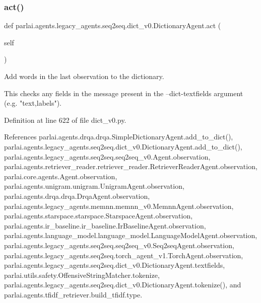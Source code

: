\mbox{\label{classparlai_1_1agents_1_1legacy__agents_1_1seq2seq_1_1dict__v0_1_1DictionaryAgent_ab0369e37e5da8b1d44a95c4765701cdc}} 
\subsubsection{\texorpdfstring{act()}{act()}}
{\footnotesize\ttfamily def parlai.\+agents.\+legacy\+\_\+agents.\+seq2seq.\+dict\+\_\+v0.\+Dictionary\+Agent.\+act (\begin{DoxyParamCaption}\item[{}]{self }\end{DoxyParamCaption})}

\begin{DoxyVerb}Add words in the last observation to the dictionary.

This checks any fields in the message present in the --dict-textfields
argument (e.g. "text,labels").
\end{DoxyVerb}
 

Definition at line 622 of file dict\+\_\+v0.\+py.



References parlai.\+agents.\+drqa.\+drqa.\+Simple\+Dictionary\+Agent.\+add\+\_\+to\+\_\+dict(), parlai.\+agents.\+legacy\+\_\+agents.\+seq2seq.\+dict\+\_\+v0.\+Dictionary\+Agent.\+add\+\_\+to\+\_\+dict(), parlai.\+agents.\+legacy\+\_\+agents.\+seq2seq.\+seq2seq\+\_\+v0.\+Agent.\+observation, parlai.\+agents.\+retriever\+\_\+reader.\+retriever\+\_\+reader.\+Retriever\+Reader\+Agent.\+observation, parlai.\+core.\+agents.\+Agent.\+observation, parlai.\+agents.\+unigram.\+unigram.\+Unigram\+Agent.\+observation, parlai.\+agents.\+drqa.\+drqa.\+Drqa\+Agent.\+observation, parlai.\+agents.\+legacy\+\_\+agents.\+memnn.\+memnn\+\_\+v0.\+Memnn\+Agent.\+observation, parlai.\+agents.\+starspace.\+starspace.\+Starspace\+Agent.\+observation, parlai.\+agents.\+ir\+\_\+baseline.\+ir\+\_\+baseline.\+Ir\+Baseline\+Agent.\+observation, parlai.\+agents.\+language\+\_\+model.\+language\+\_\+model.\+Language\+Model\+Agent.\+observation, parlai.\+agents.\+legacy\+\_\+agents.\+seq2seq.\+seq2seq\+\_\+v0.\+Seq2seq\+Agent.\+observation, parlai.\+agents.\+legacy\+\_\+agents.\+seq2seq.\+torch\+\_\+agent\+\_\+v1.\+Torch\+Agent.\+observation, parlai.\+agents.\+legacy\+\_\+agents.\+seq2seq.\+dict\+\_\+v0.\+Dictionary\+Agent.\+textfields, parlai.\+utils.\+safety.\+Offensive\+String\+Matcher.\+tokenize, parlai.\+agents.\+legacy\+\_\+agents.\+seq2seq.\+dict\+\_\+v0.\+Dictionary\+Agent.\+tokenize(), and parlai.\+agents.\+tfidf\+\_\+retriever.\+build\+\_\+tfidf.\+type.



